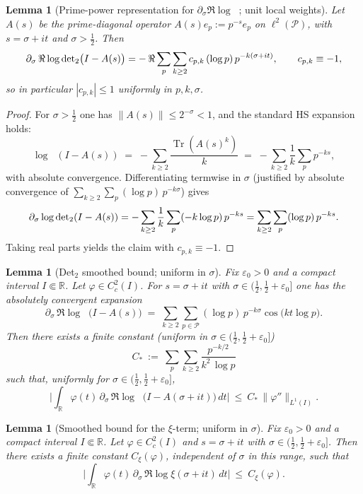 \documentclass[11pt]{article}
\newtheorem{lemma}[theorem]{Lemma}
\theoremstyle{definition}
\theoremstyle{remark}
\newcommand{\R}{\mathbb{R}}
\newcommand{\PP}{\mathcal{P}}
\DeclareMathOperator{\Tr}{Tr}
\DeclareMathOperator{\dettwo}{det_2}
\begin{document}
\begin{lemma}[Prime-power representation for \(\partial_\sigma\Re\log\dettwo\); unit local weights]\label{lem:pp-rep-det2}
Let \(A(s)\) be the prime-diagonal operator \(A(s)e_p:=p^{-s}e_p\) on \(\ell^2(\PP)\), with \(s=\sigma+it\) and \(\sigma>\tfrac12\). Then
\[
  \partial_\sigma\,\Re\log\dettwo\!\big(I-A(s)\big)
  \\= -\,\Re\sum_{p}\sum_{k\ge 2} c_{p,k}\,(\log p)\,p^{-k(\sigma+it)},\qquad c_{p,k}\equiv -1,
\]
so in particular \(|c_{p,k}|\le 1\) uniformly in \(p,k,\sigma\).
\end{lemma}
\begin{proof}
For \(\sigma>\tfrac12\) one has \(\|A(s)\|\le 2^{-\sigma}<1\), and the standard HS expansion holds:
\[
  \log\dettwo(I-A(s))\;=\;-\sum_{k\ge 2} \frac{\Tr(A(s)^k)}{k}\;=\;-\sum_{k\ge 2}\frac1k\sum_{p}p^{-ks},
\]
with absolute convergence. Differentiating termwise in \(\sigma\) (justified by absolute convergence of \(\sum_{k\ge 2}\sum_p (\log p)\,p^{-k\sigma}\)) gives
\[
  \partial_\sigma \log\dettwo(I-A(s))
  \\= -\sum_{k\ge 2}\frac1k\sum_p (-k\log p)\,p^{-ks}
  \\=\sum_{k\ge 2}\sum_p (\log p)\,p^{-ks}.
\]
Taking real parts yields the claim with \(c_{p,k}\equiv -1\).
\end{proof}
\begin{lemma}[Det$_2$ smoothed bound; uniform in \(\sigma\)]\label{lem:det2-smoothed-target}
Fix \(\varepsilon_0>0\) and a compact interval \(I\Subset\R\). Let \(\varphi\in C_c^2(I)\). For \(s=\sigma+it\) with \(\sigma\in(\tfrac12,\tfrac12+\varepsilon_0]\) one has the absolutely convergent expansion
\[
 \partial_\sigma\,\Re\log\dettwo\big(I-A(s)\big)
 \;=\; \sum_{k\ge 2}\sum_{p\in\PP} (\log p)\,p^{-k\sigma}\cos\big(k t\log p\big).
\]
Then there exists a finite constant (uniform in \(\sigma\in(\tfrac12,\tfrac12+\varepsilon_0]\))
\[
 C_*\ :=\ \sum_{p}\sum_{k\ge 2}\frac{p^{-k/2}}{k^2\,\log p}
\]
such that, uniformly for \(\sigma\in(\tfrac12,\tfrac12+\varepsilon_0]\),
\[
 \Big|\int_{\R} \varphi(t)\,\partial_\sigma\,\Re\log\dettwo\big(I-A(\sigma+it)\big)\,dt\Big|
 \ \le\ C_*\,\|\varphi''\|_{L^1(I)}.
\]
\end{lemma}
\begin{lemma}[Smoothed bound for the \(\xi\)-term; uniform in \(\sigma\)]\label{lem:xi-smoothed}
Fix \(\varepsilon_0>0\) and a compact interval \(I\Subset\R\). Let \(\varphi\in C_c^2(I)\) and \(s=\sigma+it\) with \(\sigma\in(\tfrac12,\tfrac12+\varepsilon_0]\). Then there exists a finite constant \(C_\xi(\varphi)\), independent of \(\sigma\) in this range, such that
\[
 \Big|\int_{\R}\varphi(t)\,\partial_\sigma\,\Re\log\xi(\sigma+it)\,dt\Big|\ \le\ C_\xi(\varphi).
\]
\end{lemma}
\end{document}
